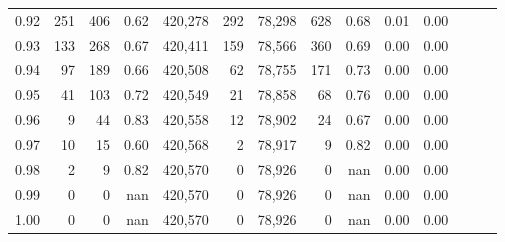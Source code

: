 \begin{tabular}{rrrrrrrrrrrrrr}
0.92 &    251 &    406 &  0.62 &  420,278 &      292 &  78,298 &     628 &  0.68 &  0.01 &      0.00 \\
0.93 &    133 &    268 &  0.67 &  420,411 &      159 &  78,566 &     360 &  0.69 &  0.00 &      0.00 \\
0.94 &     97 &    189 &  0.66 &  420,508 &       62 &  78,755 &     171 &  0.73 &  0.00 &      0.00 \\
0.95 &     41 &    103 &  0.72 &  420,549 &       21 &  78,858 &      68 &  0.76 &  0.00 &      0.00 \\
0.96 &      9 &     44 &  0.83 &  420,558 &       12 &  78,902 &      24 &  0.67 &  0.00 &      0.00 \\
0.97 &     10 &     15 &  0.60 &  420,568 &        2 &  78,917 &       9 &  0.82 &  0.00 &      0.00 \\
0.98 &      2 &      9 &  0.82 &  420,570 &        0 &  78,926 &       0 &   nan &  0.00 &      0.00 \\
0.99 &      0 &      0 &   nan &  420,570 &        0 &  78,926 &       0 &   nan &  0.00 &      0.00 \\
1.00 &      0 &      0 &   nan &  420,570 &        0 &  78,926 &       0 &   nan &  0.00 &      0.00 \\
\bottomrule
\end{tabular}

